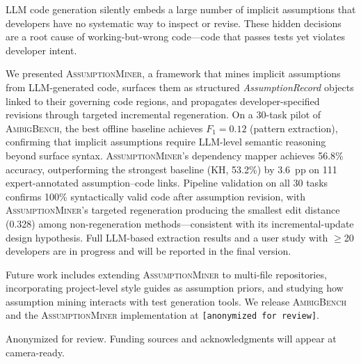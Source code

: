 \documentclass[sigconf,review,anonymous]{acmart}
\newcommand{\sysname}{\textsc{AssumptionMiner}\xspace}
\newcommand{\benchname}{\textsc{AmbigBench}\xspace}
\begin{document}
LLM code generation silently embeds a large number of implicit assumptions that
developers have no systematic way to inspect or revise.  These hidden decisions
are a root cause of working-but-wrong code—code that passes tests yet violates
developer intent.

We presented \sysname, a framework that mines implicit assumptions from
LLM-generated code, surfaces them as structured \emph{AssumptionRecord} objects
linked to their governing code regions, and propagates developer-specified
revisions through targeted incremental regeneration.  On a 30-task pilot of \benchname, the best offline baseline achieves $F_1=0.12$
(pattern extraction), confirming that implicit assumptions require LLM-level semantic
reasoning beyond surface syntax.
\sysname's dependency mapper achieves 56.8\% accuracy, outperforming the strongest
baseline (KH, 53.2\%) by 3.6~pp on 111 expert-annotated assumption--code links.
Pipeline validation on all 30 tasks confirms 100\% syntactically valid code after
assumption revision, with \sysname's targeted regeneration producing the smallest
edit distance (0.328) among non-regeneration methods—consistent with its
incremental-update design hypothesis.
Full LLM-based extraction results and a user study with $\geq$20 developers
are in progress and will be reported in the final version.

Future work includes extending \sysname to multi-file repositories, incorporating
project-level style guides as assumption priors, and studying how assumption mining
interacts with test generation tools.  We release \benchname and the \sysname
implementation at \texttt{[anonymized for review]}.

\begin{acks}
Anonymized for review. Funding sources and acknowledgments will appear at camera-ready.
\end{acks}

\balance


\end{document}
